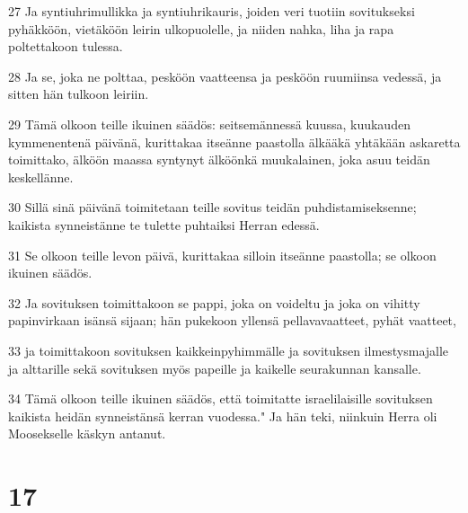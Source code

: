 \par 27 Ja syntiuhrimullikka ja syntiuhrikauris, joiden veri tuotiin sovitukseksi pyhäkköön, vietäköön leirin ulkopuolelle, ja niiden nahka, liha ja rapa poltettakoon tulessa.
\par 28 Ja se, joka ne polttaa, pesköön vaatteensa ja pesköön ruumiinsa vedessä, ja sitten hän tulkoon leiriin.
\par 29 Tämä olkoon teille ikuinen säädös: seitsemännessä kuussa, kuukauden kymmenentenä päivänä, kurittakaa itseänne paastolla älkääkä yhtäkään askaretta toimittako, älköön maassa syntynyt älköönkä muukalainen, joka asuu teidän keskellänne.
\par 30 Sillä sinä päivänä toimitetaan teille sovitus teidän puhdistamiseksenne; kaikista synneistänne te tulette puhtaiksi Herran edessä.
\par 31 Se olkoon teille levon päivä, kurittakaa silloin itseänne paastolla; se olkoon ikuinen säädös.
\par 32 Ja sovituksen toimittakoon se pappi, joka on voideltu ja joka on vihitty papinvirkaan isänsä sijaan; hän pukekoon yllensä pellavavaatteet, pyhät vaatteet,
\par 33 ja toimittakoon sovituksen kaikkeinpyhimmälle ja sovituksen ilmestysmajalle ja alttarille sekä sovituksen myös papeille ja kaikelle seurakunnan kansalle.
\par 34 Tämä olkoon teille ikuinen säädös, että toimitatte israelilaisille sovituksen kaikista heidän synneistänsä kerran vuodessa." Ja hän teki, niinkuin Herra oli Moosekselle käskyn antanut.

\chapter{17}

